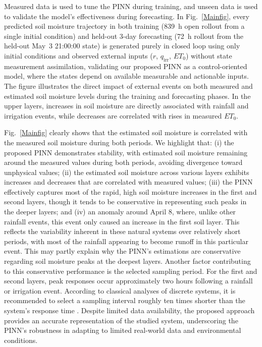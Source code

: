 \documentclass[pdflatex,sn-nature]{sn-jnl}%
\theoremstyle{thmstyleone}%
\theoremstyle{thmstyletwo}%
\theoremstyle{thmstylethree}%
\begin{document}
Measured data is used to tune the PINN during training, and unseen data is used to validate the model's effectiveness during forecasting. In Fig.~\ref{Mainfig}, every predicted soil moisture trajectory in both training (839~h open rollout from a single initial condition) and held-out 3-day forecasting (72~h rollout from the held-out May~3 21:00:00 state) is generated purely in closed loop using only initial conditions and observed external inputs ($r$, $q_{\mathrm{irr}}$, $ET_0$) without state measurement assimilation, validating our proposed PINN as a control-oriented model, where the states depend on available measurable and actionable inputs. The figure illustrates the direct impact of external events on both measured and estimated soil moisture levels during the training and forecasting phases. In the upper layers, increases in soil moisture are directly associated with rainfall and irrigation events, while decreases are correlated with rises in measured $ET_0$.

Fig.~\ref{Mainfig} clearly shows that the estimated soil moisture is correlated with the measured soil moisture during both periods. We highlight that: (i) the proposed PINN demonstrates stability, with estimated soil moisture remaining around the measured values during both periods, avoiding divergence toward unphysical values; (ii) the estimated soil moisture across various layers exhibits increases and decreases that are correlated with measured values; (iii) the PINN effectively captures most of the rapid, high soil moisture increases in the first and second layers, though it tends to be conservative in representing such peaks in the deeper layers; and (iv) an anomaly around April 8, where, unlike other rainfall events, this event only caused an increase in the first soil layer. This reflects the variability inherent in these natural systems over relatively short periods, with most of the rainfall appearing to become runoff in this particular event. This may partly explain why the PINN’s estimations are conservative regarding soil moisture peaks at the deepest layers. Another factor contributing to this conservative performance is the selected sampling period. For the first and second layers, peak responses occur approximately two hours following a rainfall or irrigation event. According to classical analyses of discrete systems, it is recommended to select a sampling interval roughly ten times shorter than the system's response time \cite{Franklin1998}. Despite limited data availability, the proposed approach provides an accurate representation of the studied system, underscoring the PINN's robustness in adapting to limited real-world data and environmental conditions.
\end{document}
